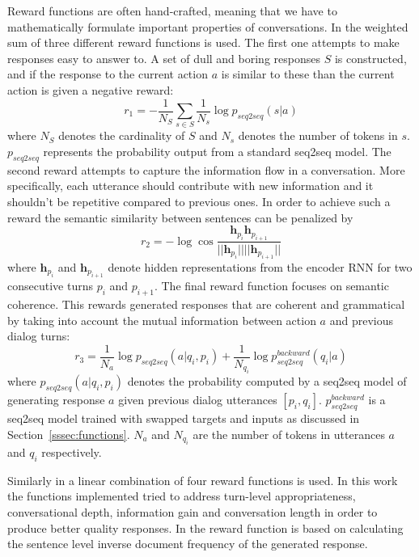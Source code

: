 \documentclass[12pt]{article}
\begin{document}
Reward functions are often hand-crafted, meaning that we have to mathematically formulate important properties of conversations. In \cite{Li_RL:2016} the weighted sum of three different reward functions is used. The first one attempts to make responses easy to answer to. A set of dull and boring responses \(S\) is constructed, and if the response to the current action \(a\) is similar to these than the current action is given a negative reward:
\begin{equation}
r_1=-\frac{1}{N_S}\sum_{s\in S}\frac{1}{N_s}\log{p_{seq2seq}(s|a)}
\end{equation}
where \(N_S\) denotes the cardinality of \(S\) and \(N_s\) denotes the number of tokens in \(s\). \(p_{seq2seq}\) represents the probability output from a standard seq2seq model. The second reward attempts to capture the information flow in a conversation. More specifically, each utterance should contribute with new information and it shouldn't be repetitive compared to previous ones. In order to achieve such a reward the semantic similarity between sentences can be penalized by
\begin{equation}
r_2=-\log{\cos{\frac{\bm{h}_{p_{i}} \bm{h}_{p_{i+1}}}{||\bm{h}_{p_{i}}|| ||\bm{h}_{p_{i+1}}|| }}}
\end{equation}
where \(\bm{h}_{p_{i}}\) and \(\bm{h}_{p_{i+1}}\) denote hidden representations from the encoder RNN for two consecutive turns \(p_i\) and \(p_{i+1}\). The final reward function focuses on semantic coherence. This rewards generated responses that are coherent and grammatical by taking into account the mutual information between action \(a\) and previous dialog turns:
\begin{equation}
r_3=\frac{1}{N_a}\log{p_{seq2seq}(a|q_i,p_i)}+\frac{1}{N_{q_i}}\log{p_{seq2seq}^{backward}(q_i|a)}
\end{equation}
where \(p_{seq2seq}(a|q_i,p_i)\) denotes the probability computed by a seq2seq model of generating response \(a\) given previous dialog utterances \([p_i,q_i]\). \(p_{seq2seq}^{backward}\) is a seq2seq model trained with swapped targets and inputs as discussed in Section~\ref{sssec:functions}. \(N_a\) and \(N_{q_i}\) are the number of tokens in utterances \(a\) and \(q_i\) respectively.

Similarly in \cite{Yu:2017} a linear combination of four reward functions is used. In this work the functions implemented tried to address turn-level appropriateness, conversational depth, information gain and conversation length in order to produce better quality responses. In \cite{Yao:2016} the reward function is based on calculating the sentence level inverse document frequency \cite{Salton:1988} of the generated response.
\end{document}
